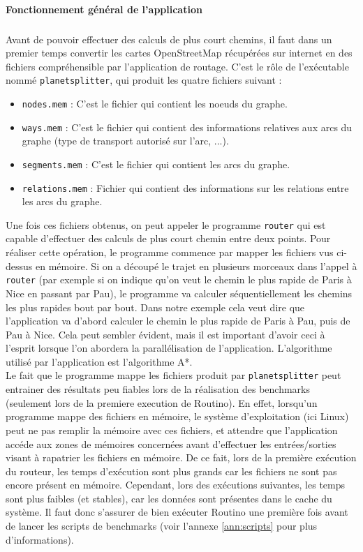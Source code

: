 \paragraph{Fonctionnement général de l'application}
\subparagraph{}

Avant de pouvoir effectuer des calculs de plus court chemins, il faut dans un 
premier temps convertir les cartes OpenStreetMap récupérées sur internet en des 
fichiers compréhensible par l'application de routage. C'est le rôle de 
l'exécutable nommé \texttt{planetsplitter}, qui produit les quatre fichiers 
suivant :

\begin{itemize}
\item \texttt{nodes.mem} : C'est le fichier qui contient les noeuds du graphe.
\item \texttt{ways.mem} : C'est le fichier qui contient des informations 
relatives aux arcs du graphe (type de transport autorisé sur l'arc, ...).
\item \texttt{segments.mem} : C'est le fichier qui contient les arcs du graphe.
\item \texttt{relations.mem} : Fichier qui contient des informations sur les 
relations entre les arcs du graphe. \\
\end{itemize}

Une fois ces fichiers obtenus, on peut appeler le programme \texttt{router} qui 
est capable d'effectuer des calculs de plus court chemin entre deux points. 
Pour réaliser cette opération, le programme commence par mapper les fichiers 
vus ci-dessus en mémoire. Si on a découpé le trajet en plusieurs morceaux dans
l'appel à \texttt{router} (par exemple si on indique qu'on veut le chemin le 
plus rapide de Paris à Nice en passant par Pau), le programme va calculer 
séquentiellement les chemins les plus rapides bout par bout. Dans notre exemple 
cela veut dire que l'application va d'abord calculer le chemin le plus rapide de 
Paris à Pau, puis de Pau à Nice. Cela peut sembler évident, mais il est 
important d'avoir ceci à l'esprit lorsque l'on abordera la parallélisation de 
l'application. L'algorithme utilisé par l'application est l'algorithme A*. \\

Le fait que le programme mappe les fichiers produit par \texttt{planetsplitter} 
peut entrainer des résultats peu fiables lors de la réalisation des benchmarks
 (seulement lors de la premiere execution de Routino). En effet, lorsqu'un 
programme mappe des fichiers en mémoire, le système d'exploitation (ici Linux) 
peut ne pas remplir la mémoire avec ces fichiers, et attendre que l'application 
accéde aux zones de mémoires concernées avant d'effectuer les entrées/sorties 
visant à rapatrier les fichiers en mémoire. De ce fait, lors de la première 
exécution du routeur, les temps d'exécution sont plus grands car les fichiers 
ne sont pas encore présent en mémoire. Cependant, lors des exécutions suivantes,
les temps sont plus faibles (et stables), car les données sont présentes dans le
 cache du système. Il faut donc s'assurer de bien exécuter Routino une première 
fois avant de lancer les scripts de benchmarks (voir l'annexe \ref{ann:scripts}
pour plus d'informations). 
 


